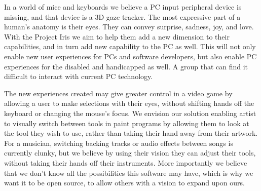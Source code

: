 
In a world of mice and keyboards we believe a PC input peripheral device is missing, and that device is a 3D gaze tracker. The most expressive part of a human's anatomy is their eyes. They can convey surprise, sadness, joy, and love. With the Project Iris we aim to help them add a new dimension to their capabilities, and in turn add new capability to the PC as well. This will not only enable new user experiences for PCs and software developers, but also enable PC experiences for the disabled and handicapped as well. A group that can find it difficult to interact with current PC technology.

The new experiences created may give greater control in a video game by allowing a user to make selections with their eyes, without shifting hands off the keyboard or changing the mouse's focus. We envision our solution enabling artist to visually switch between tools in paint programs by allowing them to look at the tool they wish to use, rather than taking their hand away from their artwork. For a musician, switching backing tracks or audio effects between songs is currently clunky, but we believe by using their vision they can adjust their tools, without taking their hands off their instruments. More importantly we believe that we don't know all the possibilities this software may have, which is why we want it to be open source, to allow others with a vision to expand upon ours.